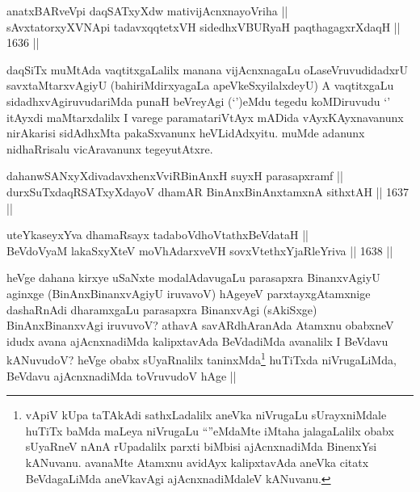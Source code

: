 
\begin{shl}
anatxBARveV\s pi daqSATxyXdw mativijAcnxnayoVriha || \\
sAvxtatorxyXVNApi tadavxqqtetxVH sidedhxVBURyaH paqthagagxrXdaqH \hfill || 1636 ||  
\end{shl}

\begin{artha}
daqSiTx muMtAda vaqtitxgaLalilx manana vijAcnxnagaLu oLaseVruvudidadxrU savxtaMtarxvAgiyU (bahiriMdirxyagaLa apeVkeSxyilalxdeyU) A vaqtitxgaLu sidadhxvAgiruvudariMda punaH beVreyAgi (`\stext')eMdu tegedu koMDiruvudu `\stext' itAyxdi maMtarxdalilx I varege paramatariVtAyx mADida vAyxKAyxnavanunx nirAkarisi sidAdhxMta pakaSxvanunx heVLidAdxyitu. muMde adanunx nidhaRrisalu vicAravanunx tegeyutAtxre. 
\end{artha}

\begin{shl}
dahanwSANxyXdivadavxhenxVviRBinAnxH suyxH parasapxramf || \\
durxSuTxdaqRSATxyXdayoV dhamAR BinAnxBinAnxtamxnA sithxtAH \hfill || 1637 ||  
\end{shl}

\begin{shl}
uteYkaseyxYva dhamaRsayx tadaboVdhoVtathxBeVdataH || \\
BeVdoV\s yaM lakaSxyXteV moVhAdarxveVH sovxVtethxYjaRleYriva \hfill || 1638 ||  
\end{shl}

\begin{artha}
heVge dahana kirxye uSaNxte modalAdavugaLu parasapxra BinanxvAgiyU aginxge (BinAnxBinanxvAgiyU iruvavoV) hAgeyeV parxtayxgAtamxnige dashaRnAdi dharamxgaLu parasapxra BinanxvAgi (sAkiSxge) BinAnxBinanxvAgi iruvuvoV? athavA savARdhAranAda Atamxnu obabxneV idudx avana ajAcnxnadiMda kalipxtavAda BeVdadiMda avanalilx I BeVdavu kANuvudoV? heVge obabx sUyaRnalilx taninxMda\footnote{vApiV kUpa taTAkAdi sathxLadalilx aneVka niVrugaLu sUrayxniMdale huTiTx baMda maLeya niVrugaLu ``\stext''eMdaMte iMtaha jalagaLalilx obabx sUyaRneV nAnA rUpadalilx parxti biMbisi ajAcnxnadiMda BinenxYsi kANuvanu. avanaMte Atamxnu avidAyx kalipxtavAda aneVka citatx BeVdagaLiMda aneVkavAgi ajAcnxnadiMdaleV kANuvanu.} huTiTxda niVrugaLiMda, BeVdavu ajAcnxnadiMda toVruvudoV hAge ||
\end{artha}


